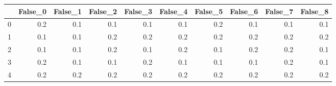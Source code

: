 \begin{tabular}{lrrrrrrrrr}
\toprule
{} &  False\_0 &  False\_1 &  False\_2 &  False\_3 &  False\_4 &  False\_5 &  False\_6 &  False\_7 &  False\_8 \\ \hline
\midrule
0 &      0.2 &      0.1 &      0.1 &      0.1 &      0.1 &      0.2 &      0.1 &      0.1 &      0.1 \\ \hline
1 &      0.1 &      0.1 &      0.2 &      0.2 &      0.2 &      0.2 &      0.2 &      0.2 &      0.2 \\ \hline
2 &      0.1 &      0.1 &      0.2 &      0.1 &      0.2 &      0.1 &      0.2 &      0.2 &      0.1 \\ \hline
3 &      0.2 &      0.1 &      0.1 &      0.2 &      0.1 &      0.1 &      0.1 &      0.2 &      0.1 \\ \hline
4 &      0.2 &      0.2 &      0.2 &      0.2 &      0.2 &      0.2 &      0.2 &      0.2 &      0.2 \\ \hline
\bottomrule
\end{tabular}
